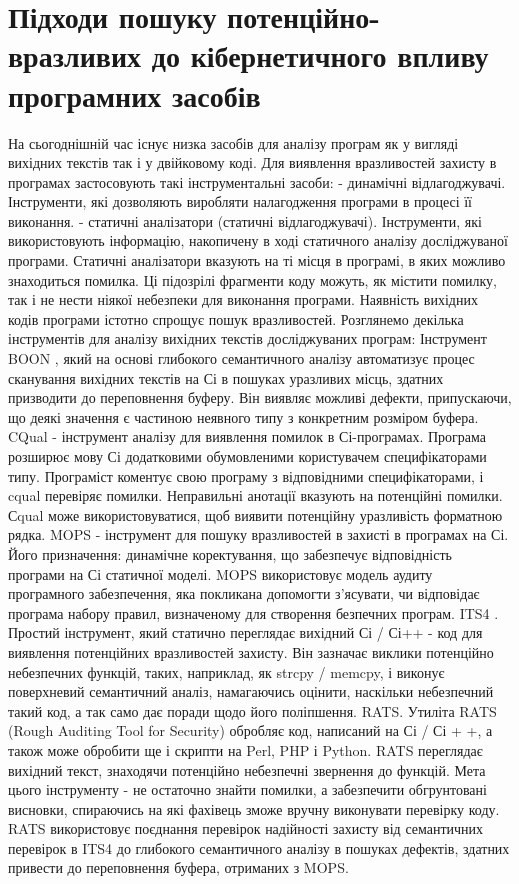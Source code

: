 \documentclass[oneside,final,14pt]{extreport}
\begin{document}
\section{Підходи пошуку потенційно-вразливих до кібернетичного впливу програмних засобів}
\label{1section:id3}
На сьогоднішній час існує низка засобів для аналізу програм як у вигляді вихідних текстів так і у двійковому коді.
Для виявлення вразливостей захисту в програмах застосовують такі інструментальні засоби:
-   динамічні відлагоджувачі. Інструменти, які дозволяють виробляти налагодження програми в процесі її виконання.
-   статичні аналізатори (статичні відлагоджувачі). Інструменти, які використовують інформацію, накопичену в ході статичного аналізу досліджуваної програми.
Статичні аналізатори вказують на ті місця в програмі, в яких можливо знаходиться помилка. Ці підозрілі фрагменти коду можуть, як містити помилку, так і не нести ніякої небезпеки для виконання програми. Наявність вихідних кодів програми істотно спрощує пошук вразливостей.
Розглянемо декілька інструментів для аналізу вихідних текстів досліджуваних програм:
Інструмент BOON , який на основі глибокого семантичного аналізу автоматизує процес сканування вихідних текстів на Сі в пошуках уразливих місць, здатних призводити до переповнення буферу. Він виявляє можливі дефекти, припускаючи, що деякі значення є частиною неявного типу з конкретним розміром буфера.
CQual - інструмент аналізу для виявлення помилок в Сі-програмах. Програма розширює мову Сі додатковими обумовленими користувачем специфікаторами типу. Програміст коментує свою програму з відповідними специфікаторами, і cqual перевіряє помилки. Неправильні анотації вказують на потенційні помилки. Сqual може використовуватися, щоб виявити потенційну уразливість форматною рядка.
MOPS - інструмент для пошуку вразливостей в захисті в програмах на Сі. Його призначення: динамічне коректування, що забезпечує відповідність програми на Сі статичної моделі. MOPS використовує модель аудиту програмного забезпечення, яка покликана допомогти з'ясувати, чи відповідає програма набору правил, визначеному для створення безпечних програм.
ITS4 . Простий інструмент, який статично переглядає вихідний Сі / Сі++ - код для виявлення потенційних вразливостей захисту. Він зазначає виклики потенційно небезпечних функцій, таких, наприклад, як strcpy / memcpy, і виконує поверхневий семантичний аналіз, намагаючись оцінити, наскільки небезпечний такий код, а так само дає поради щодо його поліпшення.
RATS. Утиліта RATS (Rough Auditing Tool for Security) обробляє код, написаний на Сі / Сі + +, а також може обробити ще і скрипти на Perl, PHP і Python. RATS переглядає вихідний текст, знаходячи потенційно небезпечні звернення до функцій. Мета цього інструменту - не остаточно знайти помилки, а забезпечити обгрунтовані висновки, спираючись на які фахівець зможе вручну виконувати перевірку коду. RATS використовує поєднання перевірок надійності захисту від семантичних перевірок в ITS4 до глибокого семантичного аналізу в пошуках дефектів, здатних привести до переповнення буфера, отриманих з MOPS.
\end{document}
